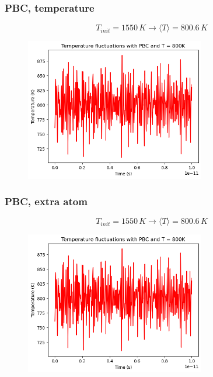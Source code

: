 \documentclass{beamer}
\begin{document}
\begin{frame}
    \frametitle{PBC, temperature}

    $$T_{init}=1550\,K \rightarrow \langle T \rangle =  800.6    \,K $$

    \begin{figure}
        \includegraphics[width=0.7\textwidth]{images/temp5800k.png}
    \end{figure}

\end{frame}

\begin{frame}
    \frametitle{PBC, extra atom}

    $$T_{init}=1550\,K \rightarrow \langle T \rangle =  800.6    \,K $$

    \begin{figure}
        \includegraphics[width=0.7\textwidth]{images/temp5800k.png}
    \end{figure}

\end{frame}
\end{document}

